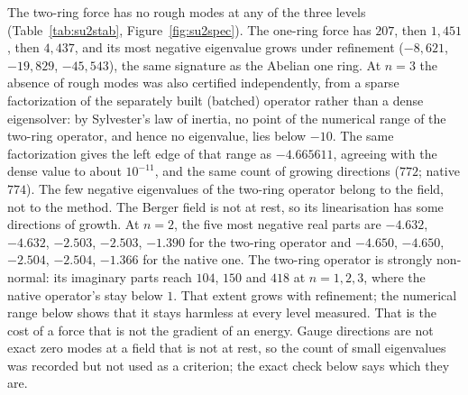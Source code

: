 \documentclass[11pt]{article}
\theoremstyle{definition}
\theoremstyle{remark}
\begin{document}
The two-ring force has no rough modes at any of the three levels (Table~\ref{tab:su2stab},
Figure~\ref{fig:su2spec}). The one-ring
force has $207$, then $1{,}451$, then $4{,}437$, and its most negative eigenvalue grows under
refinement ($-8{,}621$, $-19{,}829$, $-45{,}543$), the same signature as the Abelian one ring.
At $n=3$ the absence of rough modes was also certified independently, from a sparse
factorization of the separately built (batched) operator rather than a dense eigensolver: by
Sylvester's law of inertia, no point of the numerical range of the two-ring operator, and hence
no eigenvalue, lies below $-10$. The same factorization gives the left edge of that range as
$-4.665611$, agreeing with the dense value to about $10^{-11}$, and the same count of growing
directions ($772$; native $774$). The few negative eigenvalues of the two-ring
operator belong to the field, not to the method. The Berger field is not at rest, so its
linearisation has some directions of growth. At $n=2$, the five most negative real parts
are $-4.632$, $-4.632$, $-2.503$, $-2.503$, $-1.390$ for the two-ring operator and $-4.650$,
$-4.650$, $-2.504$, $-2.504$, $-1.366$ for the native one. The two-ring operator is strongly
non-normal: its imaginary parts reach $104$, $150$ and $418$ at $n=1,2,3$, where the native
operator's stay below $1$. That extent grows with refinement; the numerical range below shows
that it stays harmless at every level measured.
That is the cost of a force that is not the gradient of an energy. Gauge directions are
not exact zero modes at a field that is not at rest, so the count of small eigenvalues was
recorded but not used as a criterion; the exact check below says which they are.
\end{document}
